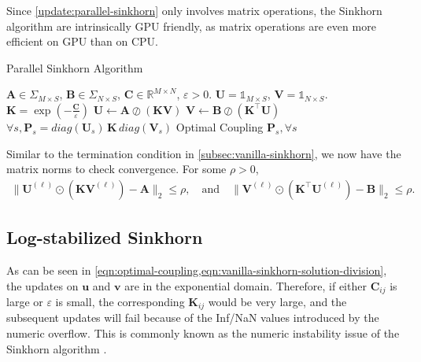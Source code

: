 \begin{remark}[]
  Since \cref{update:parallel-sinkhorn} only involves matrix operations,
  the Sinkhorn algorithm are intrinsically GPU friendly, as matrix operations are even more efficient on GPU than on CPU.
\end{remark}


\begin{algorithm}[H]
  \caption{Parallel Sinkhorn Algorithm}
  \begin{algorithmic}[1]\label{algo:parallel-sinkhorn}
    \Require $\mathbf{A} \in \Sigma_{M\times S}$, $\mathbf{B}\in \Sigma_{N\times S}$, $\mathbf{C} \in \mathbb{R}^{M\times N}$, $\varepsilon > 0$.
    \Initialize $\mathbf{U} = \mathbb{1}_{M \times S}$, $\mathbf{V} = \mathbb{1}_{N \times S}$.
    \State $\mathbf{K} = \exp(-\frac{\mathbf{C}}{\varepsilon})$
    \State $\mathbf{U} \leftarrow \mathbf{A} \oslash (\mathbf{K} \mathbf{V})$
    \State $\mathbf{V} \leftarrow \mathbf{B} \oslash (\mathbf{K}^\top \mathbf{U})$
    \EndWhile
    \State $\forall s, \mathbf{P}_s = diag(\mathbf{U}_s) \, \mathbf{K} \, diag(\mathbf{V}_s)$
    \Ensure Optimal Coupling $\mathbf{P}_s, \forall s$
  \end{algorithmic}
\end{algorithm}

\begin{remark}
  Similar to the termination condition in \cref{subsec:vanilla-sinkhorn}, we now have the matrix norms to check convergence.
  For some $\rho > 0$,
  \begin{equation*}
    \begin{aligned}
      \lVert
      \mathbf{U}^{(\ell)} \odot \left(\mathbf{K} \mathbf{V}^{(\ell)}\right) - \mathbf{A}
      \rVert_2 \le \rho,
      \quad\text{and}\quad
      \lVert
      \mathbf{V}^{(\ell)} \odot \left(\mathbf{K}^\top \mathbf{U}^{(\ell)}\right) - \mathbf{B}
      \rVert_2 \le \rho.
    \end{aligned}
  \end{equation*}
\end{remark}


\subsection{Log-stabilized Sinkhorn}\label{subsec:log-sinkhorn}

As can be seen in \cref{eqn:optimal-coupling,eqn:vanilla-sinkhorn-solution-division},
the updates on $\mathbf{u}$ and $\mathbf{v}$ are in the exponential domain.
Therefore, if either $\mathbf{C}_{ij}$ is large or $\varepsilon$ is small,
the corresponding $\mathbf{K}_{ij}$ would be very large,
and the subsequent updates will fail because of the Inf/NaN values introduced by the numeric overflow.
This is commonly known as the numeric instability issue of the Sinkhorn algorithm \citep[Chapter 4.4]{peyre2019}.

